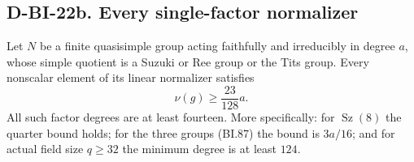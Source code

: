 \subsection*{D-BI-22b. Every single-factor normalizer}

\begin{lemma}
\label{D-BI-22b}
Let $N$ be a finite quasisimple group acting faithfully and
irreducibly in degree $a$, whose simple quotient is a Suzuki
or Ree group or the Tits group.  Every nonscalar element of
its linear normalizer satisfies
\[
                         \nu(g)\ge\frac{23}{128}a.        \tag{BI.88}
\]
All such factor degrees are at least fourteen.  More specifically:
for $\operatorname{Sz}(8)$ the quarter bound holds; for the
three groups (BI.87) the bound is $3a/16$; and for actual field
size $q\ge32$ the minimum degree is at least $124$.
\end{lemma}

